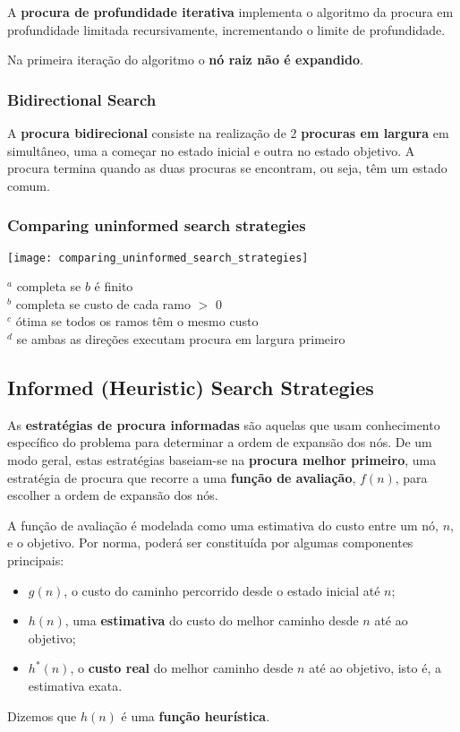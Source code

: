 \documentclass[11pt]{article}
\begin{document}
A \textbf{procura de profundidade iterativa} implementa o algoritmo da procura em profundidade limitada recursivamente, incrementando o limite de profundidade.

Na primeira iteração do algoritmo o \textbf{nó raiz não é expandido}.

\subsubsection{Bidirectional Search}

A \textbf{procura bidirecional} consiste na realização de 2 \textbf{procuras em largura} em simultâneo, uma a começar no estado inicial e outra no estado objetivo. A procura termina quando as duas procuras se encontram, ou seja, têm um estado comum.

\subsubsection{Comparing uninformed search strategies}

\texttt{[image: comparing\_uninformed\_search\_strategies]}

$^a$ completa se $b$ é finito \\
$^b$ completa se custo de cada ramo $>$ 0 \\
$^c$ ótima se todos os ramos têm o mesmo custo \\
$^d$ se ambas as direções executam procura em largura primeiro

\subsection{Informed (Heuristic) Search Strategies}

As \textbf{estratégias de procura informadas} são aquelas que usam conhecimento específico do problema para determinar a ordem de expansão dos nós. De um modo geral, estas estratégias baseiam-se na \textbf{procura melhor primeiro}, uma estratégia de procura que recorre a uma \textbf{função de avaliação}, $f(n)$, para escolher a ordem de expansão dos nós.\vspace{4pt}

A função de avaliação é modelada como uma estimativa do custo entre um nó, $n$, e o objetivo. Por norma, poderá ser constituída por algumas componentes principais:
\begin{itemize}[topsep=4pt,itemsep=0pt]
    \item $g(n)$, o custo do caminho percorrido desde o estado inicial até $n$;
    \item $h(n)$, uma \textbf{estimativa} do custo do melhor caminho desde $n$ até ao objetivo;
    \item $h^*(n)$, o \textbf{custo real} do melhor caminho desde $n$ até ao objetivo, isto é, a estimativa exata.
\end{itemize}
Dizemos que $h(n)$ é uma \textbf{função heurística}.
\end{document}
